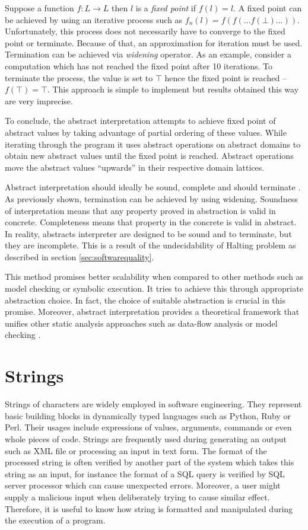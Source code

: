 \documentclass[12pt,final,oneside]{fithesis2}
\theoremstyle{definition}
\begin{document}
Suppose a function $f: L \to L$ then $l$ is a \textit{fixed point}
if $f(l) = l$. A fixed point can be achieved by using an iterative process
such as $f_n(l) = f(f( \dots f(\bot) \dots ))$. Unfortunately, this process
does not necessarily have to converge to the fixed point or terminate.
Because of that, an approximation for iteration must be used. Termination
can be achieved via \textit{widening} operator. As an example, consider a
computation which has not reached the fixed point after 10 iterations.
To terminate the process, the value is set to $\top$ hence the fixed point
is reached -- $f(\top) = \top$. This approach is simple to implement but
results obtained this way are very imprecise.

To conclude, the abstract interpretation attempts to achieve fixed point of
abstract values by taking advantage of partial ordering of these values.
While iterating through the program it uses abstract operations on abstract
domains to obtain new abstract values until the fixed point is reached.
Abstract operations move the abstract values ``upwards'' in their respective
domain lattices.

Abstract interpretation should ideally be sound, complete and should
terminate \cite{aiaa10}. As previously shown, termination can be achieved by
using widening. Soundness of interpretation means that any property proved
in abstraction is valid in concrete. Completeness means that property in
the concrete is valid in abstract. In reality, abstracts interpreter are
designed to be sound and to terminate, but they are incomplete. This is
a result of the undecidability of Halting problem as described in
section \ref{sec:softwarequality}.

This method promises better scalability when compared to other
methods such as model checking or symbolic execution. It tries to achieve
this through appropriate abstraction choice. In fact, the choice of suitable
abstraction is crucial in this promise. Moreover, abstract interpretation
provides a theoretical framework that unifies other static analysis
approaches such as data-flow analysis \cite{CousotCousot77-1} or model
checking \cite{CousotCousot99-1}.


\section{Strings}
\label{sec:strings}

Strings of characters are widely employed in software engineering. They
represent basic building blocks in dynamically typed languages such as
Python, Ruby or Perl. Their usages include expressions of values,
arguments, commands or even whole pieces of code. Strings are frequently
used during generating an output such as XML file or processing an input
in text form. The format of the processed string is often verified by
another part of the system which takes this string as an input, for
instance the format of a SQL query is verified by SQL server processor
which can cause unexpected errors. Moreover, a user might supply a
malicious input when deliberately trying to cause similar effect.
Therefore, it is useful to know how string is formatted and manipulated
during the execution of a program.
\end{document}

